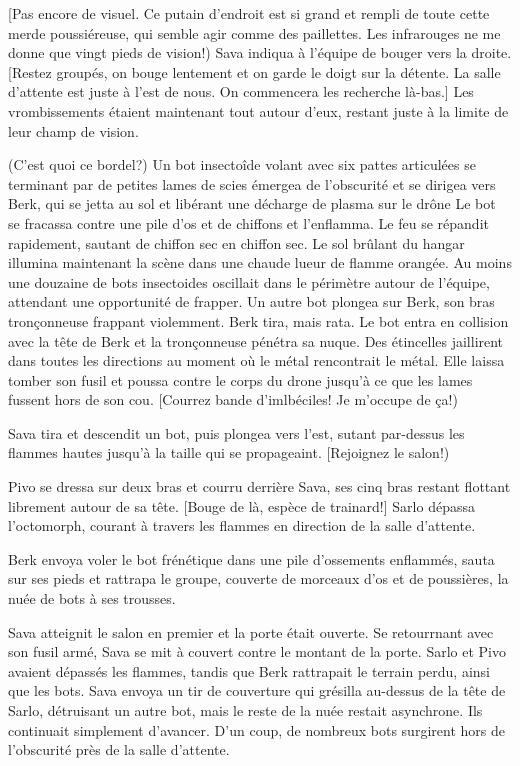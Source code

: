 [Pas encore de visuel. Ce putain d'endroit est si grand et rempli de toute cette merde poussiéreuse, qui semble agir comme des paillettes. Les infrarouges ne me donne que vingt pieds de vision!) Sava indiqua à l'équipe de bouger vers la droite. [Restez groupés, on bouge lentement et on garde le doigt sur la détente. La salle d'attente est juste à l'est de nous. On commencera les recherche là-bas.] Les vrombissements étaient maintenant tout autour d'eux, restant juste à la limite de leur champ de vision. 

(C'est quoi ce bordel?) Un bot insectoîde volant avec six pattes articulées se terminant par de petites lames de scies émergea de l'obscurité et se dirigea vers Berk, qui se jetta au sol et libérant une décharge de plasma sur le drône Le bot se fracassa contre une pile d'os et de chiffons et l'enflamma. Le feu se répandit rapidement, sautant de chiffon sec en chiffon sec. Le sol brûlant du hangar illumina maintenant la scène dans une chaude lueur de flamme orangée. Au moins une douzaine de bots insectoides oscillait dans le périmètre autour de l'équipe, attendant une opportunité de frapper. Un autre bot plongea sur Berk, son bras tronçonneuse frappant violemment. Berk tira, mais rata. Le bot entra en collision avec la tête de Berk et la tronçonneuse pénétra sa nuque. Des étincelles jaillirent dans toutes les directions au moment où le métal rencontrait le métal. Elle laissa tomber son fusil et poussa contre le corps du drone jusqu'à ce que les lames fussent hors de son cou. [Courrez bande d'imlbéciles! Je m'occupe de ça!) 

Sava tira et descendit un bot, puis plongea vers l'est, sutant par-dessus les flammes hautes jusqu'à la taille qui se propageaint. [Rejoignez le salon!) 

Pivo se dressa sur deux bras et courru derrière Sava, ses cinq bras restant flottant librement autour de sa tête. [Bouge de là, espèce de trainard!] Sarlo dépassa l'octomorph, courant à travers les flammes en direction de la salle d'attente. 

Berk envoya voler le bot frénétique dans une pile d'ossements enflammés, sauta sur ses pieds et rattrapa le groupe, couverte de morceaux d'os et de poussières, la nuée de bots à ses trousses. 

Sava atteignit le salon en premier et la porte était ouverte. Se retourrnant avec son fusil armé, Sava se mit à couvert contre le montant de la porte. Sarlo et Pivo avaient dépassés les flammes, tandis que Berk rattrapait le terrain perdu, ainsi que les bots. Sava envoya un tir de couverture qui grésilla au-dessus de la tête de Sarlo, détruisant un autre bot, mais le reste de la nuée restait asynchrone. Ils continuait simplement d'avancer. D'un coup, de nombreux bots surgirent hors de l'obscurité près de la salle d'attente. 

